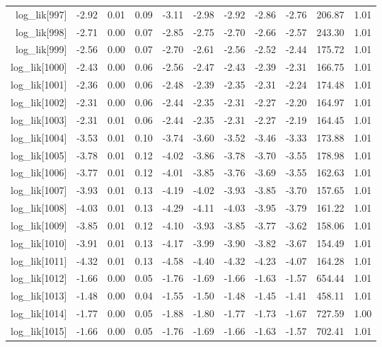 \begin{table}[ht]
\begin{tabular}{rrrrrrrrrrr}
  log\_lik[997] & -2.92 & 0.01 & 0.09 & -3.11 & -2.98 & -2.92 & -2.86 & -2.76 & 206.87 & 1.01 \\ 
  log\_lik[998] & -2.71 & 0.00 & 0.07 & -2.85 & -2.75 & -2.70 & -2.66 & -2.57 & 243.30 & 1.01 \\ 
  log\_lik[999] & -2.56 & 0.00 & 0.07 & -2.70 & -2.61 & -2.56 & -2.52 & -2.44 & 175.72 & 1.01 \\ 
  log\_lik[1000] & -2.43 & 0.00 & 0.06 & -2.56 & -2.47 & -2.43 & -2.39 & -2.31 & 166.75 & 1.01 \\ 
  log\_lik[1001] & -2.36 & 0.00 & 0.06 & -2.48 & -2.39 & -2.35 & -2.31 & -2.24 & 174.48 & 1.01 \\ 
  log\_lik[1002] & -2.31 & 0.00 & 0.06 & -2.44 & -2.35 & -2.31 & -2.27 & -2.20 & 164.97 & 1.01 \\ 
  log\_lik[1003] & -2.31 & 0.01 & 0.06 & -2.44 & -2.35 & -2.31 & -2.27 & -2.19 & 164.45 & 1.01 \\ 
  log\_lik[1004] & -3.53 & 0.01 & 0.10 & -3.74 & -3.60 & -3.52 & -3.46 & -3.33 & 173.88 & 1.01 \\ 
  log\_lik[1005] & -3.78 & 0.01 & 0.12 & -4.02 & -3.86 & -3.78 & -3.70 & -3.55 & 178.98 & 1.01 \\ 
  log\_lik[1006] & -3.77 & 0.01 & 0.12 & -4.01 & -3.85 & -3.76 & -3.69 & -3.55 & 162.63 & 1.01 \\ 
  log\_lik[1007] & -3.93 & 0.01 & 0.13 & -4.19 & -4.02 & -3.93 & -3.85 & -3.70 & 157.65 & 1.01 \\ 
  log\_lik[1008] & -4.03 & 0.01 & 0.13 & -4.29 & -4.11 & -4.03 & -3.95 & -3.79 & 161.22 & 1.01 \\ 
  log\_lik[1009] & -3.85 & 0.01 & 0.12 & -4.10 & -3.93 & -3.85 & -3.77 & -3.62 & 158.06 & 1.01 \\ 
  log\_lik[1010] & -3.91 & 0.01 & 0.13 & -4.17 & -3.99 & -3.90 & -3.82 & -3.67 & 154.49 & 1.01 \\ 
  log\_lik[1011] & -4.32 & 0.01 & 0.13 & -4.58 & -4.40 & -4.32 & -4.23 & -4.07 & 164.28 & 1.01 \\ 
  log\_lik[1012] & -1.66 & 0.00 & 0.05 & -1.76 & -1.69 & -1.66 & -1.63 & -1.57 & 654.44 & 1.01 \\ 
  log\_lik[1013] & -1.48 & 0.00 & 0.04 & -1.55 & -1.50 & -1.48 & -1.45 & -1.41 & 458.11 & 1.01 \\ 
  log\_lik[1014] & -1.77 & 0.00 & 0.05 & -1.88 & -1.80 & -1.77 & -1.73 & -1.67 & 727.59 & 1.00 \\ 
  log\_lik[1015] & -1.66 & 0.00 & 0.05 & -1.76 & -1.69 & -1.66 & -1.63 & -1.57 & 702.41 & 1.01 \\ 

\end{tabular}
\end{table}
